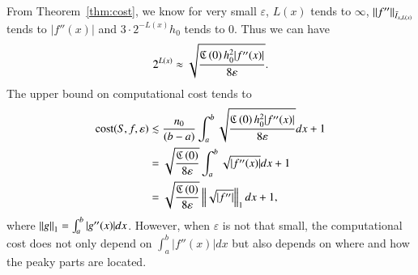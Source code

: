 From Theorem~\ref{thm:cost}, we know for very small $\varepsilon$,
$L(x)$ tends to $\infty$, $ \norm[\bar{I}_{x,L(x)}]{f''} $ tends to $|f''(x)|$ and $3\cdot 2^{-L(x)}h_0$ tends to 0.
Thus we can have
$$ 2^{L(x)} \approx \sqrt{\frac{\fC\left(0\right)  h_0^2 |f''(x)|}{8\varepsilon}}.$$
The upper bound on computational cost tends to
\begin{align*}
\cost(S,f,\varepsilon)  & \lesssim \frac{n_0}{(b-a)}\int_a^b \sqrt{\frac{\fC\left(0\right)  h_0^2 |f''(x)|}{8\varepsilon}} dx +1 \\
& =\sqrt{\frac{\fC\left(0\right)}{8\varepsilon}}\int_a^b \sqrt{|f''(x)|} dx +1\\
& =\sqrt{\frac{\fC\left(0\right)}{8\varepsilon}}\norm[1]{\sqrt{|f''|}} dx +1,
\end{align*}
where $\norm[1]{g}=\int_a^b |g''(x)| dx$.
However, when $\varepsilon$ is not that small, the computational cost does not only depend on $\int_a^b|f''(x)|dx$ but also depends on where and how the peaky parts are located.\\

